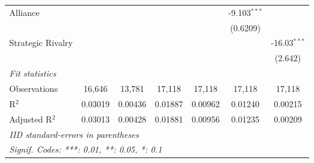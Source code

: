 \documentclass[12pt,a4paper]{article}
\begin{document}
\begin{appendices}
\begin{table}[!hptb]
\begin{tabular}{lcccccc}
   Alliance       &                 &                         &                 &                 & -9.103$^{***}$  &   \\   
                  &                 &                         &                 &                 & (0.6209)        &   \\   
   Strategic Rivalry        &                 &                         &                 &                 &                 & -16.03$^{***}$\\   
                  &                 &                         &                 &                 &                 & (2.642)\\   
   \midrule
   \emph{Fit statistics}\\
   Observations   & 16,646          & 13,781                  & 17,118          & 17,118          & 17,118          & 17,118\\  
   R$^2$          & 0.03019         & 0.00436                 & 0.01887         & 0.00962         & 0.01240         & 0.00215\\  
   Adjusted R$^2$ & 0.03013         & 0.00428                 & 0.01881         & 0.00956         & 0.01235         & 0.00209\\  
   \midrule \midrule
   \multicolumn{7}{l}{\emph{IID standard-errors in parentheses}}\\
   \multicolumn{7}{l}{\emph{Signif. Codes: ***: 0.01, **: 0.05, *: 0.1}}\\
\end{tabular}
\end{table}
\newpage



\end{appendices}
\end{document}
